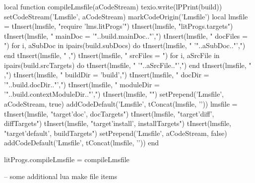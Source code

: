 \startLuaCode
local function compileLmsfile(aCodeStream)
  texio.write(lPPrint(build))
  setCodeStream('Lmsfile', aCodeStream)
  markCodeOrigin('Lmsfile')
  local lmsfile = {}
  tInsert(lmsfile, "require 'lms.litProgs'\n")
  tInsert(lmsfile, "litProgs.targets{")
  tInsert(lmsfile, "  mainDoc  = '"..build.mainDoc.."',")
  tInsert(lmsfile, "  docFiles = {")
  for i, aSubDoc in ipairs(build.subDocs) do
    tInsert(lmsfile, "    '"..aSubDoc.."',")
  end
  tInsert(lmsfile, "  },")
  tInsert(lmsfile, "  srcFiles = {")
  for i, aSrcFile in ipairs(build.srcTargets) do
    tInsert(lmsfile, "    '"..aSrcFile.."',")
  end
  tInsert(lmsfile, "  },")
  tInsert(lmsfile, "  buildDir  = 'build',")
  tInsert(lmsfile, "  docDir    = '"..build.docDir.."',")
  tInsert(lmsfile, "  moduleDir = '"..build.contextModuleDir.."',")
  tInsert(lmsfile, "}")
  setPrepend('Lmsfile', aCodeStream, true)
  addCodeDefault('Lmsfile', tConcat(lmsfile, '\n'))
  lmsfile = {}
  tInsert(lmsfile, "target{'doc',     docTargets}")
  tInsert(lmsfile, "target{'diff',    diffTargets}")
  tInsert(lmsfile, "target{'install', installTargets}")
  tInsert(lmsfile, "target{'default', buildTargets}")
  setPrepend('Lmsfile', aCodeStream, false)
  addCodeDefault('Lmsfile', tConcat(lmsfile, '\n'))
end

litProgs.compileLmsfile = compileLmsfile
\stopLuaCode

\startLmsfile
-- some additional lua make file items
\stopLmsfile

\stopchapter